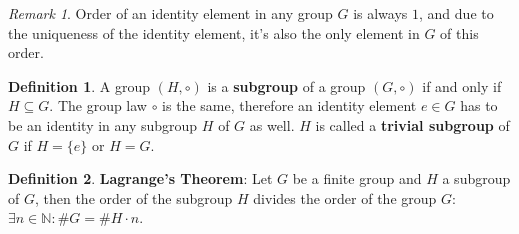 \documentclass[thesis=M,english]{FITthesis}[2012/10/20]
\theoremstyle{remark}
\newtheorem*{RM}{Remark}
\newtheorem*{NRM}{Notational Remark}
\theoremstyle{definition}
\newtheorem{DF}{Definition}[section]
\begin{document}
\begin{RM}
Order of an identity element in any group $G$ is always $1$, and due to the uniqueness of the identity element, it's also the only element in $G$ of this order.
\end{RM}
\begin{DF}
A group $(H, \circ)$ is a \textbf{subgroup} of a group $(G, \circ)$ if and only if $H \subseteq G.$ The group law $\circ$ is the same, therefore an identity element $e \in G$ has to be an identity in any subgroup $H$ of $G$ as well. $H$ is called a \textbf{trivial subgroup} of $G$ if $H = \{e\}$ or $H = G$.
\end{DF}
\begin{DF}
\textbf{Lagrange's Theorem}: Let $G$ be a finite group and $H$ a subgroup of $G$, then the order of the subgroup $H$ divides the order of the group $G$: $\exists n \in \mathbb{N}: \#G = \#H \cdot n.$
\label{lagrange}
\end{DF}
\end{document}

